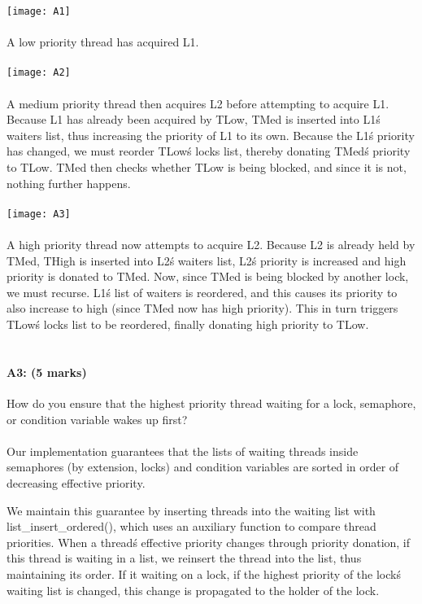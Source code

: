 \newpage
\texttt{[image: A1]}
\\
\\
A low priority thread has acquired L1.
\\
\\
\texttt{[image: A2]}
\\
\\
A medium priority thread then acquires L2 before attempting to acquire L1. Because L1 has already been acquired by TLow, TMed is inserted into L1\'s waiters list, thus increasing the priority of L1 to its own. Because the L1\'s priority has changed, we must reorder TLow\'s locks list, thereby donating TMed\'s priority to TLow. TMed then checks whether TLow is being blocked, and since it is not, nothing further happens.
\\
\\
\texttt{[image: A3]}
\\
\\
A high priority thread now attempts to acquire L2. Because L2 is already held by TMed, THigh is inserted into L2\'s waiters list, L2\'s priority is increased and high priority is donated to TMed. Now, since TMed is being blocked by another lock, we must recurse. L1\'s list of waiters is reordered, and this causes its priority to also increase to high (since TMed now has high priority). This in turn triggers TLow\'s locks list to be reordered, finally donating high priority to TLow.
\\
\\
\paragraph{A3: (5 marks)}
How do you ensure that the highest priority thread waiting for a lock, semaphore, or condition variable wakes up first?
\\
\\
Our implementation guarantees that the lists of waiting threads inside semaphores (by extension, locks) and condition variables are sorted in order of decreasing effective priority.

We maintain this guarantee by inserting threads into the waiting list with list\_insert\_ordered(), which uses an auxiliary function to compare thread priorities.
When a thread\'s effective priority changes through priority donation, if this thread is waiting in a list, we reinsert the thread into the list, thus maintaining its order. If it waiting on a lock, if the highest priority of the lock\'s waiting list is changed, this change is propagated to the holder of the lock.

